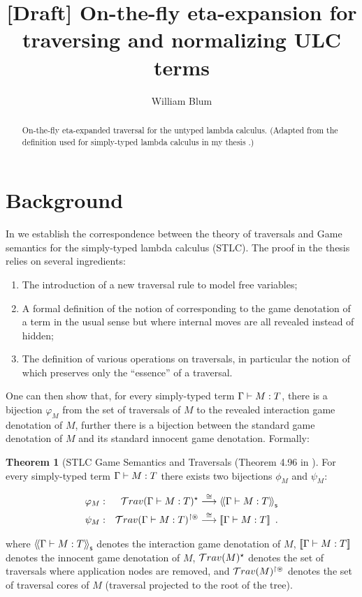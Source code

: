 \documentclass{article}
\author{William Blum}
\title{[Draft] On-the-fly eta-expansion for traversing and normalizing ULC terms}
\theoremstyle{definition}
\newtheorem{theorem}{Theorem}[section]
\begin{document}
\maketitle
\begin{abstract}
On-the-fly eta-expanded traversal for the untyped lambda calculus.
(Adapted from the definition used for simply-typed lambda calculus in my thesis \cite{BlumPhd}.)
\end{abstract}

\section{Background}

In \cite{BlumPhd} we establish the correspondence between the theory of traversals and Game semantics for the simply-typed lambda calculus (STLC). The proof in the thesis relies on several ingredients:
\begin{enumerate}
  \item The introduction of a new traversal rule  to model free variables;
  \item A formal definition of the notion of  corresponding to the game denotation of a term in the usual sense but where internal moves are all revealed instead of hidden;
  \item The definition of various operations on traversals, in particular the notion of  which preserves only the ``essence'' of a traversal.
\end{enumerate}


One can then show that, for every simply-typed term $\Gamma \vdash M :T$,
there is a bijection $\varphi_M$ from the set of traversals of $M$ to the revealed interaction game denotation of $M$, further there is a bijection between the standard game denotation of $M$ and its standard innocent game denotation. Formally:
\begin{theorem}[STLC Game Semantics and Traversals (Theorem 4.96 in \cite{BlumPhd}]
\label{thm:correspondence}
For every simply-typed term $\Gamma \vdash M :T$ there exists two bijections
$\phi_M$ and $\psi_M$:

\begin{eqnarray*}
 \varphi_M  &:& \mathcal{T}rav(\Gamma \vdash M : T)^\star \stackrel{\cong}{\longrightarrow} {\langle\!\langle \Gamma \vdash M :T \rangle\!\rangle}_{\sf s} \\
 \psi_M  &:& \mathcal{T}rav(\Gamma \vdash M : T)^{\upharpoonright \circledast} \stackrel{\cong}{\longrightarrow} {[\![ \Gamma \vdash M :T ]\!]} \enspace .
\end{eqnarray*}

where ${\langle\!\langle \Gamma \vdash M : T \rangle\!\rangle}_{\sf s}$ denotes the interaction game denotation of $M$, ${[\![ \Gamma \vdash M : T ]\!]}$ denotes the innocent game denotation of $M$,
$\mathcal{T}rav(M)^\star$ denotes the set of traversals where application nodes are removed, and $\mathcal{T}rav(M)^{\upharpoonright
\circledast}$ denotes the set of traversal cores of $M$ (\ie traversal projected to the root of the tree).
\end{theorem}
\end{document}
